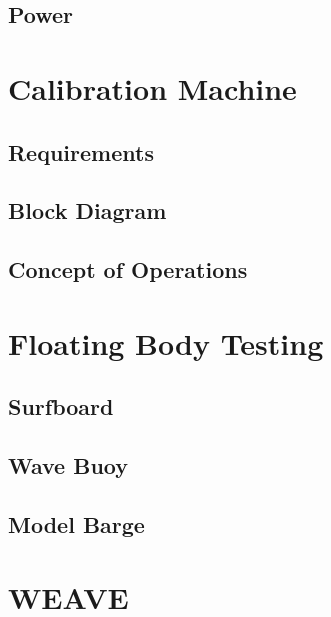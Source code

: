 \subsection{Power}

\section{Calibration Machine}

\subsection{Requirements}

\subsection{Block Diagram}

\subsection{Concept of Operations}

\section{Floating Body Testing}

\subsection{Surfboard}

\subsection{Wave Buoy}

\subsection{Model Barge}

\section{WEAVE}